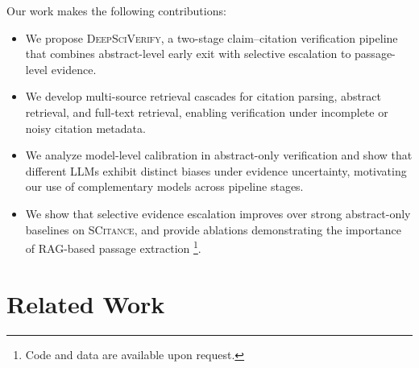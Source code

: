 \documentclass{article}
\theoremstyle{plain}
\theoremstyle{definition}
\theoremstyle{remark}
\begin{document}
Our work makes the following contributions:
\begin{itemize}[leftmargin=*, itemsep=2pt, topsep=2pt]
    \item We propose \textsc{DeepSciVerify}, a two-stage claim--citation verification pipeline that combines abstract-level early exit with selective escalation to passage-level evidence.
    \item We develop multi-source retrieval cascades for citation parsing, abstract retrieval, and full-text retrieval, enabling verification under incomplete or noisy citation metadata.
    \item We analyze model-level calibration in abstract-only verification and show that different LLMs exhibit distinct biases under evidence uncertainty, motivating our use of complementary models across pipeline stages.
    \item We show that selective evidence escalation improves over strong abstract-only baselines on \textsc{SCitance}, and provide ablations demonstrating the importance of RAG-based passage extraction \footnote{Code and data are available upon request.}.
\end{itemize}


\section{Related Work}

\end{document}
